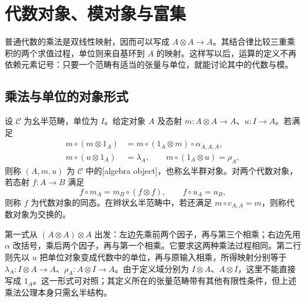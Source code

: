 
\section{代数对象、模对象与富集}
\label{b4:sec:monoidal-algebras}

普通代数的乘法是双线性映射，因而可以写成 \(A\otimes A\to A\)。其结合律比较三重乘积的两个求值过程，单位则来自基环到 \(A\) 的映射。这样写以后，运算的定义不再依赖元素记号：只要一个范畴有适当的张量与单位，就能讨论其中的代数与模。

\subsection{乘法与单位的对象形式}
\label{b4:subsec:monoidal-algebra-objects}

\begin{definition}\label{b4:def:monoidal-algebra-object}
	设 \(\mathcal C\) 为幺半范畴，单位为 \(I\)。给定对象 \(A\) 及态射 \(m:A\otimes A\to A\)、\(u:I\to A\)。若满足
	\begin{equation}\label{b4:eq:monoidal-algebra-laws}
		\begin{aligned}
			m\circ(m\otimes1_A)&=m\circ(1_A\otimes m)\circ\alpha_{A,A,A},\\
			m\circ(u\otimes1_A)&=\lambda_A,\qquad m\circ(1_A\otimes u)=\rho_A,
		\end{aligned}
	\end{equation}
	则称 \((A,m,u)\) 为 \(\mathcal C\) 中的[algebra object]，也称幺半群对象。对两个代数对象，若态射 \(f:A\to B\) 满足
	\[
		f\circ m_A=m_B\circ(f\otimes f),\qquad f\circ u_A=u_B,
	\]
	则称 \(f\) 为代数对象的同态。在辫状幺半范畴中，若还满足 \(m\circ c_{A,A}=m\)，则称代数对象为交换的。
\end{definition}

第一式从 \((A\otimes A)\otimes A\) 出发：左边先乘前两个因子，再与第三个相乘；右边先用 \(\alpha\) 改括号，乘后两个因子，再与第一个相乘。它要求这两种乘法过程相同。第二行则先以 \(u\) 把单位对象变成代数中的单位，再与原输入相乘，所得映射分别等于 \(\lambda_A:I\otimes A\to A\)、\(\rho_A:A\otimes I\to A\)。由于定义域分别为 \(I\otimes A\)、\(A\otimes I\)，这里不能直接写成 \(1_A\)。这一形式可对照\cite[Definition 7.8.1, p. 141]{EtingofEtAl2015TensorCategories}；其定义所在的张量范畴带有其他有限性条件，但上述乘法公理本身只需幺半结构。

